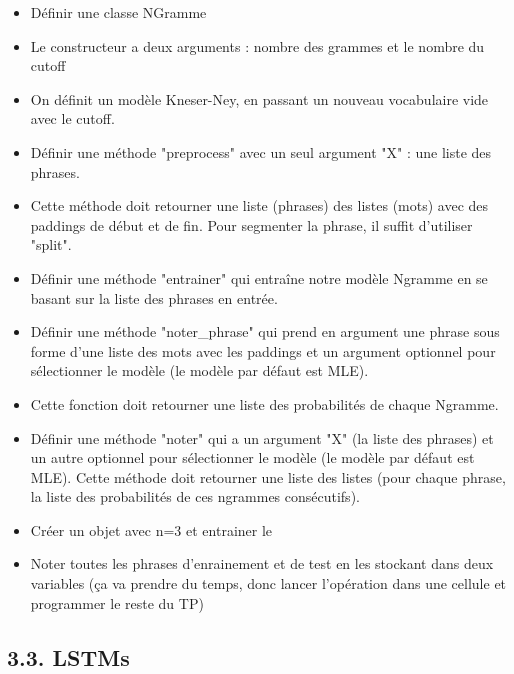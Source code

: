 \documentclass[11pt, a4paper]{article}
\begin{document}
\begin{itemize}
	\item Définir une classe NGramme 
	\item Le constructeur a deux arguments : nombre des grammes et le nombre du cutoff
	\item On définit un modèle Kneser-Ney, en passant un nouveau vocabulaire vide avec le cutoff.
	\item Définir une méthode "preprocess" avec un seul argument "X" : une liste des phrases.
	\item Cette méthode doit retourner une liste (phrases) des listes (mots) avec des paddings de début et de fin.
	Pour segmenter la phrase, il suffit d'utiliser "split".
	\item Définir une méthode "entrainer" qui entraîne notre modèle Ngramme en se basant sur la liste des phrases en entrée.	
	\item Définir une méthode "noter\_phrase" qui prend en argument une phrase sous forme d'une liste des mots avec les paddings et un argument optionnel pour sélectionner le modèle (le modèle par défaut est MLE).
	\item Cette fonction doit retourner une liste des probabilités de chaque Ngramme.
	\item Définir une méthode "noter" qui a un argument "X" (la liste des phrases) et un autre optionnel pour sélectionner le modèle (le modèle par défaut est MLE).
	Cette méthode doit retourner une liste des listes (pour chaque phrase, la liste des probabilités de ces ngrammes consécutifs).
	\item Créer un objet avec n=3 et entrainer le
	\item Noter toutes les phrases d'enrainement et de test en les stockant dans deux variables (ça va prendre du temps, donc lancer l'opération dans une cellule et programmer le reste du TP)
\end{itemize}

\subsection*{3.3. LSTMs}
\end{document}
